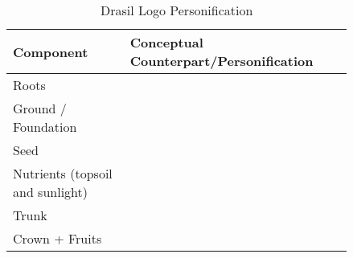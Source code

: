 \begin{longtable}[c]{|>{\raggedright}p{0.3\linewidth}|>{\raggedright\arraybackslash}p{0.54\linewidth}|}
    \caption{Drasil Logo Personification}
    \label{tab:drasilPersonification}
    \\

    \hline

    \rowcolor{McMasterMediumGrey}
    \textbf{Component}                 & \textbf{Conceptual Counterpart/Personification}
    \\ \hline

    {Roots}                            & {}
    \\ \hline

    {Ground / Foundation}              & {}
    \\ \hline

    {Seed}                             & {}
    \\ \hline

    {Nutrients (topsoil and sunlight)} & {}
    \\ \hline

    {Trunk}                            & {}
    \\ \hline

    {Crown + Fruits}                   & {}
    \\ \hline
\end{longtable}
